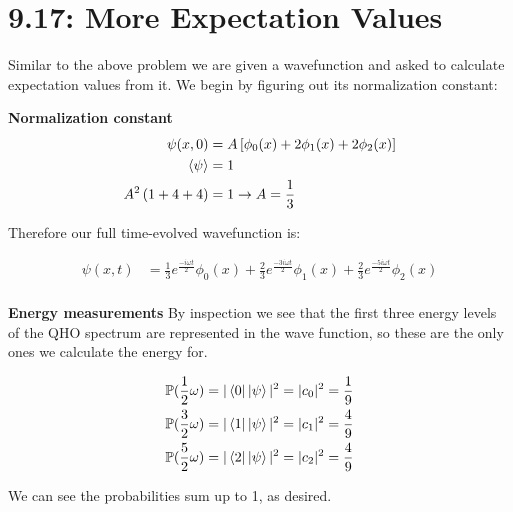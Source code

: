 \documentclass[10pt]{article} %
\begin{document}
\section{9.17: More Expectation Values}
Similar to the above problem we are given a wavefunction and asked to calculate expectation values
from it. We begin by figuring out its normalization constant:

\textbf{Normalization constant}
\begin{align*}
  \psi(x,0) &= A\left[\phi_0(x) + 2\phi_1(x) + 2\phi_2(x)\right]\\
  \braket{\psi} &= 1\\
  A^2\left(1 + 4 + 4\right) &= 1 \rightarrow A = \frac{1}{3}\\
\end{align*}

Therefore our full time-evolved wavefunction is:

\begin{align*}
  \psi(x,t) &= \frac{1}{3}e^{\frac{-i\omega t}{2}}\phi_0(x)
  + \frac{2}{3}e^{\frac{-3i\omega t}{2}}\phi_1(x)
  + \frac{2}{3}e^{\frac{-5i\omega t}{2}}\phi_2(x)\\
\end{align*}

\textbf{Energy measurements}
By inspection we see that the first three energy levels of the QHO spectrum are represented in the
wave function, so these are the only ones we calculate the energy for.

\begin{align*}
  \mathbb{P}(\frac{1}{2}\omega) &= |\bra{0}\ket{\psi}|^2 = |c_0|^2 = \frac{1}{9}\\
  \mathbb{P}(\frac{3}{2}\omega) &= |\bra{1}\ket{\psi}|^2 = |c_1|^2 = \frac{4}{9}\\
  \mathbb{P}(\frac{5}{2}\omega) &= |\bra{2}\ket{\psi}|^2 = |c_2|^2 = \frac{4}{9}\\
\end{align*}

We can see the probabilities sum up to 1, as desired.\\
\end{document}
